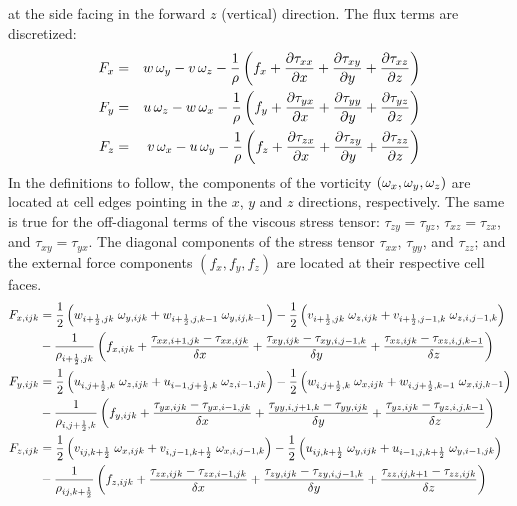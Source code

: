 at the side facing in the forward $z$ (vertical) direction.
The flux terms are discretized:
\begin{eqnarray}
F_x &=& w \, \omega_y - v \, \omega_z - \frac{1}{\rho} \left( f_x
  +  \frac{\partial \tau_{xx}}{\partial x} + \frac{\partial \tau_{xy}}{\partial y} + \frac{\partial \tau_{xz}}{\partial z} \right) \\
F_y &=& u \, \omega_z - w \, \omega_x - \frac{1}{\rho} \left( f_y
  +  \frac{\partial \tau_{yx}}{\partial x} + \frac{\partial \tau_{yy}}{\partial y} + \frac{\partial \tau_{yz}}{\partial z} \right) \\
F_z &=& v \, \omega_x - u \, \omega_y - \frac{1}{\rho} \left( f_z
  +  \frac{\partial \tau_{zx}}{\partial x} + \frac{\partial \tau_{zy}}{\partial y} + \frac{\partial \tau_{zz}}{\partial z} \right)
\end{eqnarray}
In the
definitions to follow, the components of the vorticity $(\omega_x,\omega_y,\omega_z)$
are located at cell edges pointing in the $x$, $y$ and $z$ directions,
respectively. The same is true for the off-diagonal terms of the viscous
stress tensor: $\tau_{zy}=\tau_{yz}$, $\tau_{xz}=\tau_{zx}$, and
$\tau_{xy}=\tau_{yx}$. The diagonal components of the stress
tensor $\tau_{xx}$, $\tau_{yy}$, and $\tau_{zz}$; and the external force
components $(f_x,f_y,f_z)$ are located at their
respective cell faces.
\begin{align}
F_{x,ijk} &=  \frac{1}{2} \left(
 w_{i+\frac{1}{2},jk} \; \omega_{y,ijk} +
 w_{i+\frac{1}{2},j,k-1} \; \omega_{y,ij,k-1} \right)
            - \frac{1}{2} \left(
 v_{i+\frac{1}{2},jk} \; \omega_{z,ijk} +
 v_{i+\frac{1}{2},j-1,k} \; \omega_{z,i,j-1,k} \right) \nonumber\\
           &  - \frac{1}{\rho_{i+\frac{1}{2},jk}} \left( f_{x,ijk}
  + \frac{\tau_{xx,i+1,jk}-\tau_{xx,ijk}}{\delta x}
  + \frac{\tau_{xy,ijk}-\tau_{xy,i,j-1,k}}{\delta y}
  + \frac{\tau_{xz,ijk}-\tau_{xz,i,j,k-1}}{\delta z}  \right)  \\
F_{y,ijk} &= \frac{1}{2} \left(
 u_{i,j+\frac{1}{2},k} \; \omega_{z,ijk} +
 u_{i-1,j+\frac{1}{2},k} \; \omega_{z,i-1,jk} \right)
             - \frac{1}{2} \left(
 w_{i,j+\frac{1}{2},k} \; \omega_{x,ijk}+
 w_{i,j+\frac{1}{2},k-1} \; \omega_{x,ij,k-1} \right) \nonumber \\
           &  - \frac{1}{\rho_{i,j+\frac{1}{2},k}} \left( f_{y,ijk}
  + \frac{\tau_{yx,ijk}-\tau_{yx,i-1,jk}}{\delta x}
  + \frac{\tau_{yy,i,j+1,k}-\tau_{yy,ijk}}{\delta y}
  + \frac{\tau_{yz,ijk}-\tau_{yz,i,j,k-1}}{\delta z} \right) \\
F_{z,ijk} &=  \frac{1}{2} \left(
 v_{ij,k+\frac{1}{2}} \; \omega_{x,ijk} +
 v_{i,j-1,k+\frac{1}{2}} \; \omega_{x,i,j-1,k} \right)
             -\frac{1}{2} \left(
 u_{ij,k+\frac{1}{2}} \; \omega_{y,ijk} +
 u_{i-1,j,k+\frac{1}{2}} \; \omega_{y,i-1,jk} \right) \nonumber \\
           &  - \frac{1}{\rho_{ij,k+\frac{1}{2}}} \left( f_{z,ijk}
  + \frac{\tau_{zx,ijk}-\tau_{zx,i-1,jk}}{\delta x}
  + \frac{\tau_{zy,ijk}-\tau_{zy,i,j-1,k}}{\delta y}
  + \frac{\tau_{zz,ij,k+1}-\tau_{zz,ijk}}{\delta z} \right)
\end{align}

